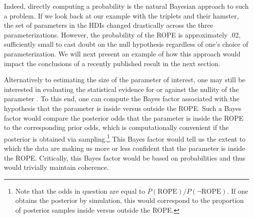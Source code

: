 \documentclass[9pt,twocolumn,twoside]{cidlab-draft}\templatetype{cidlab-invited}
\begin{document}
Indeed, directly computing a probability is the natural Bayesian approach to such a problem. If we look back at our example with the triplets and their hamster, the set of parameters in the HDIs changed drastically across the three parameterizations. However, the probability of the ROPE is approximately .02, sufficiently small to cast doubt on the null hypothesis regardless of one's choice of parameterization.  We will next present an example of how this approach would impact the conclusions of a recently published result in the next section.



Alternatively to estimating the size of the parameter of interest, one may still be interested in evaluating the statistical evidence for or against the nullity of the parameter%
. To this end, one can compute the Bayes factor associated with the hypothesis that the parameter is inside versus outside the ROPE. Such a Bayes factor would compare the posterior odds that the parameter is inside the ROPE to the corresponding prior odds, which is computationally convenient if the posterior is obtained via sampling.\footnote{Note that the odds in question are equal to $P(\text{ROPE})/P(\lnot \text{ROPE})$. If one obtains the posterior by simulation, this would correspond to the proportion of posterior samples inside versus outside the ROPE.} This Bayes factor would tell us the extent to which the data are making us more or less confident that the parameter is inside the ROPE. Critically, this Bayes factor would be based on probabilities and thus would trivially maintain coherence.
\end{document}
